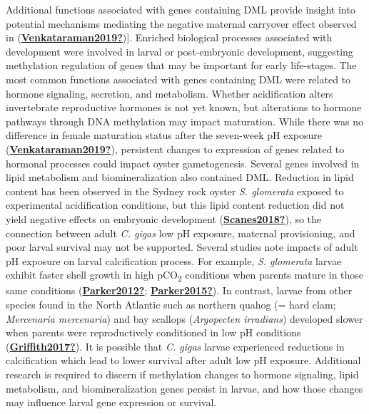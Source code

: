 \documentclass [11pt, proquest] {uwthesis}[2015/03/03]
\begin{document}
Additional functions associated with genes containing DML provide insight into potential mechanisms mediating the negative maternal carryover effect observed in (\protect\hyperlink{ref-Venkataraman2019}{\textbf{Venkataraman2019?}}){]}. Enriched biological processes associated with development were involved in larval or post-embryonic development, suggesting methylation regulation of genes that may be important for early life-stages. The most common functions associated with genes containing DML were related to hormone signaling, secretion, and metabolism. Whether acidification alters invertebrate reproductive hormones is not yet known, but alterations to hormone pathways through DNA methylation may impact maturation. While there was no difference in female maturation status after the seven-week pH exposure (\protect\hyperlink{ref-Venkataraman2019}{\textbf{Venkataraman2019?}}), persistent changes to expression of genes related to hormonal processes could impact oyster gametogenesis. Several genes involved in lipid metabolism and biomineralization also contained DML. Reduction in lipid content has been observed in the Sydney rock oyster \emph{S. glomerata} exposed to experimental acidification conditions, but this lipid content reduction did not yield negative effects on embryonic development (\protect\hyperlink{ref-Scanes2018}{\textbf{Scanes2018?}}), so the connection between adult \emph{C. gigas} low pH exposure, maternal provisioning, and poor larval survival may not be supported. Several studies note impacts of adult pH exposure on larval calcification process. For example, \emph{S. glomerata} larvae exhibit faster shell growth in high pCO\textsubscript{2} conditions when parents mature in those same conditions (\protect\hyperlink{ref-Parker2012}{\textbf{Parker2012?}}; \protect\hyperlink{ref-Parker2015}{\textbf{Parker2015?}}). In contrast, larvae from other species found in the North Atlantic such as northern quahog (= hard clam; \emph{Mercenaria mercenaria}) and bay scallops (\emph{Argopecten irradians}) developed slower when parents were reproductively conditioned in low pH conditions (\protect\hyperlink{ref-Griffith2017}{\textbf{Griffith2017?}}). It is possible that \emph{C. gigas} larvae experienced reductions in calcification which lead to lower survival after adult low pH exposure. Additional research is required to discern if methylation changes to hormone signaling, lipid metabolism, and biomineralization genes persist in larvae, and how those changes may influence larval gene expression or survival.
\end{document}
